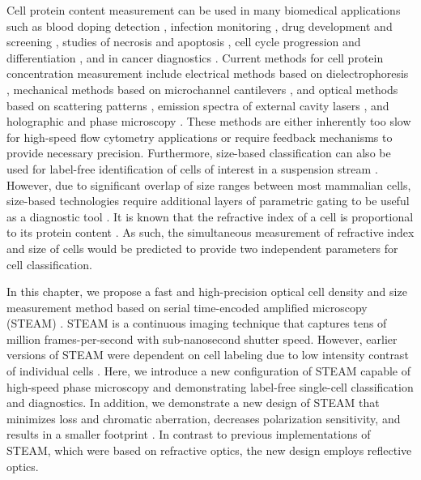 Cell protein content measurement can be used in many biomedical applications such as blood doping detection \cite{grover2011measuring}, infection monitoring \cite{mrema1979concentration}, drug development and screening \cite{chun2012rapidly}, studies of necrosis and apoptosis \cite{martin1990hl,wyllie1982hormone}, cell cycle progression and differentiation \cite{wolff1972separation,maric1998buoyant,bista2011quantification}, and in cancer diagnostics \cite{bosslet1981rapid,phillips2012quantification,phillips2012optical}. Current methods for cell protein concentration measurement include electrical methods based on dielectrophoresis \cite{gupta2012apostream}, mechanical methods based on microchannel cantilevers \cite{grover2011measuring}, and optical methods based on scattering patterns \cite{tycko1985flow}, emission spectra of external cavity lasers \cite{liang2007determining}, and holographic and phase microscopy \cite{rappaz2005measurement,curl2005refractive,lue2009live,gorthi2012phase}. These methods are either inherently too slow for high-speed flow cytometry applications or require feedback mechanisms \cite{popescu2006optical} to provide necessary precision. Furthermore, size-based classification can also be used for label-free identification of cells of interest in a suspension stream \cite{vona2000isolation}. However, due to significant overlap of size ranges between most mammalian cells, size-based technologies require additional layers of parametric gating to be useful as a diagnostic tool \cite{di2013hyperspectral}.  It is known that the refractive index of a cell is proportional to its protein content \cite{barer1954refractometry}. As such, the simultaneous measurement of refractive index and size of cells would be predicted to provide two independent parameters for cell classification.

In this chapter, we propose a fast and high-precision optical cell density and size measurement method based on serial time-encoded amplified microscopy (STEAM) \cite{goda2009serial}. STEAM is a continuous imaging technique that captures tens of million frames-per-second with sub-nanosecond shutter speed. However, earlier versions of STEAM were dependent on cell labeling due to low intensity contrast of individual cells \cite{goda2012high}. Here, we introduce a new configuration of STEAM capable of high-speed phase microscopy and demonstrating label-free single-cell classification and diagnostics. In addition, we demonstrate a new design of STEAM that minimizes loss and chromatic aberration, decreases polarization sensitivity, and results in a smaller footprint \cite{fard2011nomarski}. In contrast to previous implementations of STEAM, which were based on refractive optics, the new design employs reflective optics.

